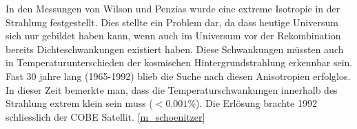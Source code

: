 In den Messungen von Wilson und Penzias wurde eine extreme Isotropie in der 
Strahlung festgestellt.
Dies stellte ein Problem dar, da dass heutige Universum sich nur gebildet haben 
kann, wenn auch im Universum vor der Rekombination bereits Dichteschwankungen 
existiert haben.
Diese Schwankungen müssten auch in Temperaturunterschieden der kosmischen 
Hintergrundstrahlung erkennbar sein.
Fast 30 jahre lang (1965-1992) blieb die Suche nach diesen Anisotropien 
erfolglos.
In dieser Zeit bemerkte man, dass die Temperaturschwankungen innerhalb des 
Strahlung extrem klein sein muss ($< 0.001\%$).
Die Erlösung brachte 1992 schliesslich der COBE Satellit.
\ref{m_schoenitzer}